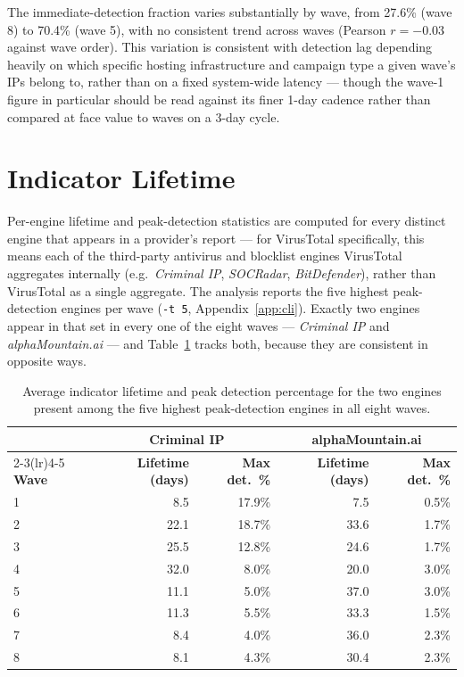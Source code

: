 \documentclass[12pt, a4paper, twoside]{report}
\begin{document}
The immediate-detection fraction varies substantially by wave, from 27.6\% (wave 8) to 70.4\%
(wave 5), with no consistent trend across waves (Pearson $r = -0.03$ against wave order). This
variation is consistent with detection lag depending heavily on which specific hosting
infrastructure and campaign type a given wave's IPs belong to, rather than on a fixed system-wide
latency --- though the wave-1 figure in particular should be read against its finer 1-day cadence
rather than compared at face value to waves on a 3-day cycle.

\section{Indicator Lifetime}

Per-engine lifetime and peak-detection statistics are computed for every distinct engine that
appears in a provider's report --- for VirusTotal specifically, this means each of the
third-party antivirus and blocklist engines VirusTotal aggregates internally (e.g.\ \emph{Criminal
IP}, \emph{SOCRadar}, \emph{BitDefender}), rather than VirusTotal as a single aggregate. The
analysis reports the five highest peak-detection engines per wave (\texttt{-t 5},
Appendix~\ref{app:cli}). Exactly two engines appear in that set in every one of the eight waves ---
\emph{Criminal IP} and \emph{alphaMountain.ai} --- and Table~\ref{tab:top_engine} tracks both,
because they are consistent in opposite ways.

\begin{table}[h]
  \centering
  \caption{Average indicator lifetime and peak detection percentage for the two engines present
    among the five highest peak-detection engines in all eight waves.}
  \label{tab:top_engine}
  \begin{tabular}{lrrrr}
    \toprule
    & \multicolumn{2}{c}{\textbf{Criminal IP}} & \multicolumn{2}{c}{\textbf{alphaMountain.ai}} \\
    \cmidrule(lr){2-3}\cmidrule(lr){4-5}
    \textbf{Wave} & \textbf{Lifetime (days)} & \textbf{Max det.\ \%}
                  & \textbf{Lifetime (days)} & \textbf{Max det.\ \%} \\
    \midrule
    1 & 8.5  & 17.9\% & 7.5  & 0.5\% \\
    2 & 22.1 & 18.7\% & 33.6 & 1.7\% \\
    3 & 25.5 & 12.8\% & 24.6 & 1.7\% \\
    4 & 32.0 & 8.0\%  & 20.0 & 3.0\% \\
    5 & 11.1 & 5.0\%  & 37.0 & 3.0\% \\
    6 & 11.3 & 5.5\%  & 33.3 & 1.5\% \\
    7 & 8.4  & 4.0\%  & 36.0 & 2.3\% \\
    8 & 8.1  & 4.3\%  & 30.4 & 2.3\% \\
    \bottomrule
  \end{tabular}
\end{table}
\end{document}
